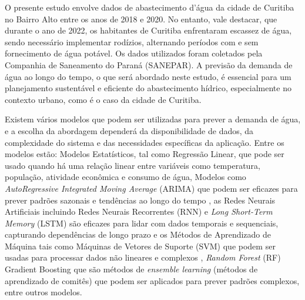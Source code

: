 O presente estudo envolve dados de abastecimento d'água da cidade de Curitiba no Bairro Alto entre os anos de 2018 e 2020. No entanto, vale destacar, que durante o ano de 2022, os habitantes de Curitiba enfrentaram escassez de água, sendo necessário implementar rodízios, alternando períodos com e sem fornecimento de água potável. Os dados utilizados foram coletados pela Companhia de Saneamento do Paraná (SANEPAR). A previsão da demanda de água ao longo do tempo, o que será abordado neste estudo, é essencial para um planejamento sustentável e eficiente do abastecimento hídrico, especialmente no contexto urbano, como é o caso da cidade de Curitiba. 

Existem vários modelos que podem ser utilizadas para prever a demanda de água, e a escolha da abordagem dependerá da disponibilidade de dados, da complexidade do sistema e das necessidades específicas da aplicação. Entre os modelos estão: Modelos Estatísticos, tal como Regressão Linear, que pode ser usado quando há uma relação linear entre variáveis como temperatura, população, atividade econômica e consumo de água, Modelos como \textit{AutoRegressive Integrated Moving Average} (ARIMA) que podem ser eficazes para prever padrões sazonais e tendências ao longo do tempo \cite{OLIVEIRA2017177}, as Redes Neurais Artificiais incluindo Redes Neurais Recorrentes (RNN) \cite{ASEERI2023101984} e \textit{Long Short-Term Memory} (LSTM) \cite{SABZIPOUR2023130380} são eficazes para lidar com dados temporais e sequenciais, capturando dependências de longo prazo e os Métodos de Aprendizado de Máquina tais como Máquinas de Vetores de Suporte (SVM) que podem ser usadas para processar dados não lineares e complexos \cite{CANDELIERI2019202}, \textit{Random Forest} (RF) \cite{ALI2023731} Gradient Boosting \cite{DONG2023105579} que são métodos de \textit{ensemble learning} (métodos de aprendizado de comitês) que podem ser aplicados para prever padrões complexos, entre outros modelos. 

